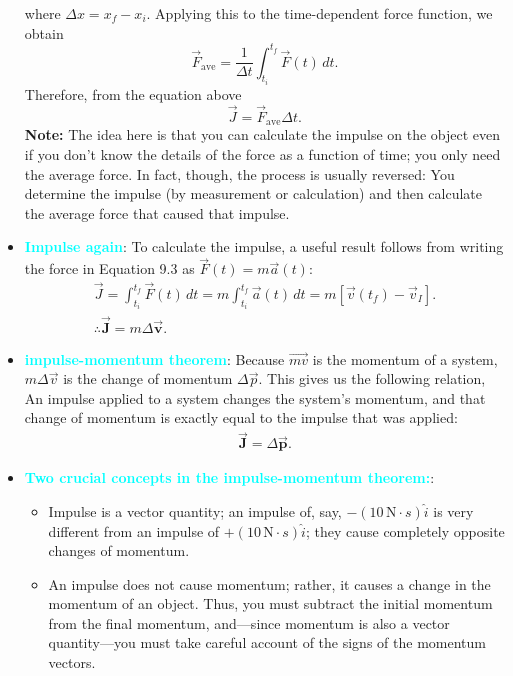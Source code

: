 \documentclass{report}
\begin{document}
\begin{itemize}
\[            \]
            where $\Delta x = x_f - x_i$. Applying this to the time-dependent force function, we obtain
            \[
                \vec{F}_{\text{ave}} = \frac{1}{\Delta t} \int_{t_i}^{t_f} \vec{F}(t) \, dt.
            \]
            Therefore, from the equation above
            \[
                \vec{J} = \vec{F}_{\text{ave}} \Delta t.
            \]
            \bigbreak \noindent 
            \textbf{Note:} The idea here is that you can calculate the impulse on the object even if you don’t know the details of the force as a function of time; you only need the average force. In fact, though, the process is usually reversed: You determine the impulse (by measurement or calculation) and then calculate the average force that caused that impulse.
        \item \textbf{\textcolor{cyan}{Impulse again}}:
            To calculate the impulse, a useful result follows from writing the force in Equation 9.3 as $\vec{F}(t) = m\vec{a}(t)$:
            \begin{align*}
                \vec{J} = \int_{t_i}^{t_f} \vec{F}(t) \, dt = m\int_{t_i}^{t_f} \vec{a}(t) \, dt = m[\vec{v}(t_f) - \vec{v}_I]. \\
                \therefore \vec{\mathbf{J}} = m\Delta\vec{\mathbf{v}}
            .\end{align*}
        \item \textbf{\textcolor{cyan}{impulse-momentum theorem}}:
            Because $\vec{mv}$ is the momentum of a system, $m\Delta\vec{v}$ is the change of momentum $\Delta\vec{p}$. This gives us the following relation,
            \bigbreak \noindent 
            An impulse applied to a system changes the system’s momentum, and that change of momentum is exactly equal to the impulse that was applied:
            \begin{align*}
                \vec{\mathbf{J}} = \Delta \vec{\mathbf{p}}
            .\end{align*}
        \item \textbf{\textcolor{cyan}{Two crucial concepts in the impulse-momentum theorem:}}:
            \begin{itemize}
                \item Impulse is a vector quantity; an impulse of, say, $-(10\, \text{N} \cdot s) \hat{i}$ is very different from an impulse of $+(10\, \text{N} \cdot s) \hat{i}$; they cause completely opposite changes of momentum.
                \item An impulse does not cause momentum; rather, it causes a change in the momentum of an object. Thus, you must subtract the initial momentum from the final momentum, and---since momentum is also a vector quantity---you must take careful account of the signs of the momentum vectors.

\end{itemize}
\end{itemize}
\end{document}
